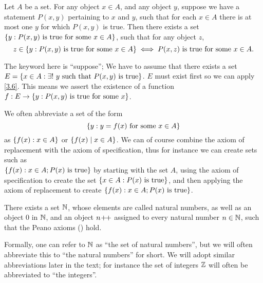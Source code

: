 \begin{ax}[Replacement]\label{3.6}
  Let \(A\) be a set.
  For any object \(x \in A\), and any object \(y\), suppose we have a statement \(P(x, y)\) pertaining to \(x\) and \(y\), such that for each \(x \in A\) there is at most one \(y\) for which \(P(x, y)\) is true.
  Then there exists a set \(\left\lbrace y : P(x, y) \text{ is true for some } x \in A\right\rbrace\), such that for any object \(z\),
  \[
    z \in \left\lbrace y: P(x, y) \text{ is true for some } x \in A\right\rbrace \iff P(x, z) \text{ is true for some } x \in A.
  \]
\end{ax}

\begin{note}
  The keyword here is ``suppose'';
  We have to assume that there exists a set \(E = \left\lbrace x \in A : \exists!\ y \text{ such that } P(x, y) \text{ is true}\right\rbrace\).
  \(E\) must exist first so we can apply \cref{3.6}.
  This means we assert the existence of a function \(f : E \to \left\lbrace y : P(x, y) \text{ is true for some } x\right\rbrace\).
\end{note}

\begin{note}
  We often abbreviate a set of the form
  \[
    \left\lbrace y : y = f(x) \text{ for some } x \in A\right\rbrace
  \]
  as \(\left\lbrace f(x) : x \in A\right\rbrace\) or \(\left\lbrace f(x) \mid x \in A\right\rbrace\).
  We can of course combine the axiom of replacement with the axiom of specification, thus for instance we can create sets such as \\
  \(\left\lbrace f(x) : x \in A; P(x) \text{ is true}\right\rbrace\) by starting with the set \(A\), using the axiom of specification to create the set \(\left\lbrace x \in A : P(x) \text{ is true}\right\rbrace\), and then applying the axiom of replacement to create \(\left\lbrace f(x) : x \in A; P(x) \text{ is true}\right\rbrace\).
\end{note}

\begin{ax}[Infinity]\label{3.7}
  There exists a set \(\mathbb{N}\), whose elements are called natural numbers, as well as an object \(0\) in \(\mathbb{N}\), and an object \(n\!+\!\!+\) assigned to every natural number \(n \in \mathbb{N}\), such that the Peano axioms () hold.
\end{ax}

\begin{note}
  Formally, one can refer to \(\mathbb{N}\) as ``the set of natural numbers'', but we will often abbreviate this to ``the natural numbers'' for short.
  We will adopt similar abbreviations later in the text;
  for instance the set of integers \(\mathbb{Z}\) will often be abbreviated to ``the integers''.
\end{note}

